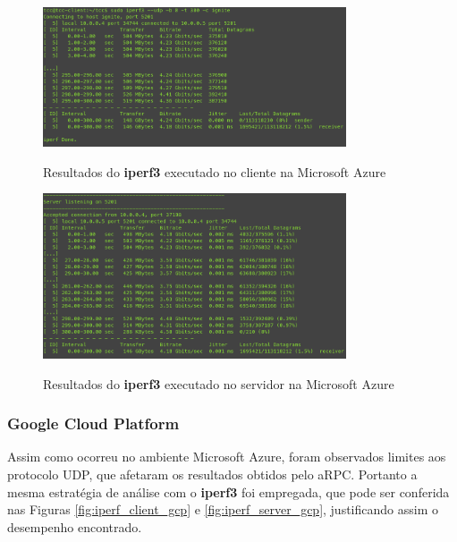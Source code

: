\begin{figure}[ht]
    \centering
    \caption{Resultados do \textbf{iperf3} executado no cliente na Microsoft Azure}
    \includegraphics[width=0.8\textwidth]{figuras/transporte/iperf_client_azure.png} 
    \label{fig:iperf_client_azure}
\end{figure}

\begin{figure}[!ht]
    \centering
    \caption{Resultados do \textbf{iperf3} executado no servidor na Microsoft Azure}
    \includegraphics[width=0.8\textwidth]{figuras/transporte/iperf_server_azure.png} 
    \label{fig:iperf_server_azure}
\end{figure}

\subsubsection{Google Cloud Platform}

Assim como ocorreu no ambiente Microsoft Azure, foram observados limites aos protocolo UDP, que afetaram os resultados obtidos pelo aRPC. Portanto a mesma estratégia de análise com o \textbf{iperf3} foi empregada, que pode ser conferida nas Figuras \ref{fig:iperf_client_gcp} e \ref{fig:iperf_server_gcp}, justificando assim o desempenho encontrado.

